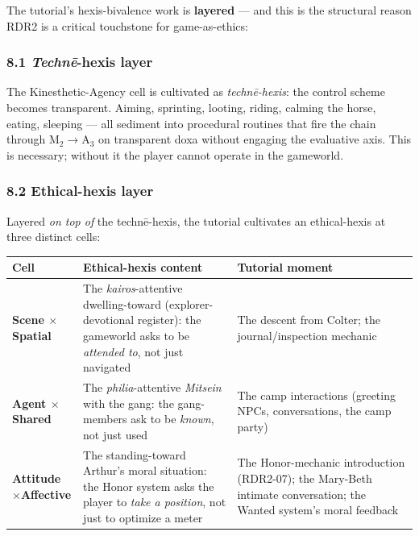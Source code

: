 \documentclass[11pt]{report}
\begin{document}
The tutorial's hexis-bivalence work is \textbf{layered} — and this is the structural reason RDR2 is a critical touchstone for game-as-ethics:


\subsubsection{8.1 \textit{Technē}-hexis layer}


The Kinesthetic-Agency cell is cultivated as \textit{technē-hexis}: the control scheme becomes transparent. Aiming, sprinting, looting, riding, calming the horse, eating, sleeping — all sediment into procedural routines that fire the chain through M$_2$$\rightarrow$\allowbreak A$_3$ on transparent doxa without engaging the evaluative axis. This is necessary; without it the player cannot operate in the gameworld.


\subsubsection{8.2 Ethical-hexis layer}


Layered \textit{on top of} the technē-hexis, the tutorial cultivates an ethical-hexis at three distinct cells:


\begin{table}[H]
\renewcommand{\arraystretch}{1.25}
\begin{tabularx}{\textwidth}{>{\RaggedRight\arraybackslash}X>{\RaggedRight\arraybackslash}X>{\RaggedRight\arraybackslash}X}
\toprule
Cell & Ethical-hexis content & Tutorial moment \\
\midrule
\textbf{Scene $\times$\allowbreak  Spatial} & The \textit{kairos}-attentive dwelling-toward (explorer-devotional register): the gameworld asks to be \textit{attended to}, not just navigated & The descent from Colter; the journal/inspection mechanic \\
\textbf{Agent $\times$\allowbreak  Shared} & The \textit{philia}-attentive \textit{Mitsein} with the gang: the gang-members ask to be \textit{known}, not just used & The camp interactions (greeting NPCs, conversations, the camp party) \\
\textbf{Attitude $\times$\allowbreak  Affective} & The standing-toward Arthur's moral situation: the Honor system asks the player to \textit{take a position}, not just to optimize a meter & The Honor-mechanic introduction (RDR2-07); the Mary-Beth intimate conversation; the Wanted system's moral feedback \\
\bottomrule
\end{tabularx}
\end{table}
\end{document}
